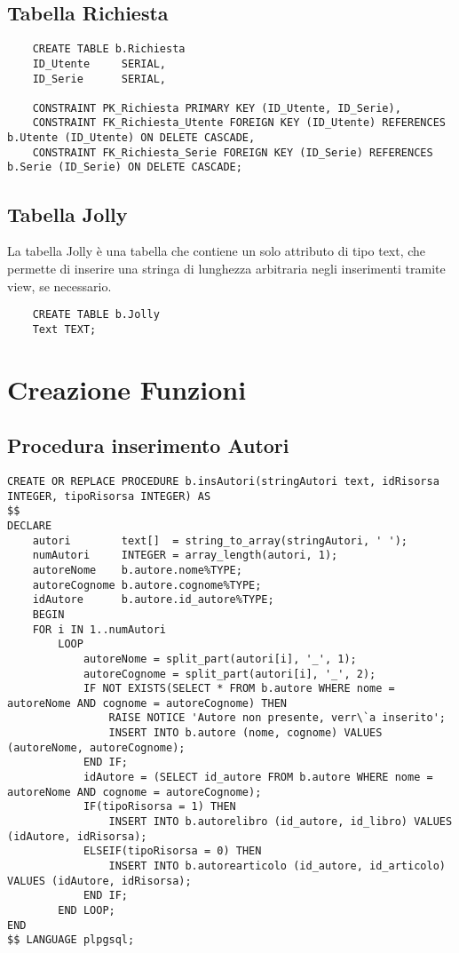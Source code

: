 \newpage

\subsection{Tabella Richiesta}
\begin{lstlisting}
    CREATE TABLE b.Richiesta
    ID_Utente     SERIAL,
    ID_Serie      SERIAL,

    CONSTRAINT PK_Richiesta PRIMARY KEY (ID_Utente, ID_Serie),
    CONSTRAINT FK_Richiesta_Utente FOREIGN KEY (ID_Utente) REFERENCES b.Utente (ID_Utente) ON DELETE CASCADE,
    CONSTRAINT FK_Richiesta_Serie FOREIGN KEY (ID_Serie) REFERENCES b.Serie (ID_Serie) ON DELETE CASCADE;
\end{lstlisting}

\subsection{Tabella Jolly}
La tabella Jolly \`e una tabella che contiene un solo attributo di tipo text, che permette di
inserire una stringa di lunghezza arbitraria negli inserimenti tramite view, se necessario.
\begin{lstlisting}
    CREATE TABLE b.Jolly
    Text TEXT;
\end{lstlisting}

\section{Creazione Funzioni}

\subsection{Procedura inserimento Autori}
\begin{lstlisting}
CREATE OR REPLACE PROCEDURE b.insAutori(stringAutori text, idRisorsa INTEGER, tipoRisorsa INTEGER) AS
$$
DECLARE
    autori        text[]  = string_to_array(stringAutori, ' ');
    numAutori     INTEGER = array_length(autori, 1);
    autoreNome    b.autore.nome%TYPE;
    autoreCognome b.autore.cognome%TYPE;
    idAutore      b.autore.id_autore%TYPE;
    BEGIN
    FOR i IN 1..numAutori
        LOOP
            autoreNome = split_part(autori[i], '_', 1);
            autoreCognome = split_part(autori[i], '_', 2);
            IF NOT EXISTS(SELECT * FROM b.autore WHERE nome = autoreNome AND cognome = autoreCognome) THEN
                RAISE NOTICE 'Autore non presente, verr\`a inserito';
                INSERT INTO b.autore (nome, cognome) VALUES (autoreNome, autoreCognome);
            END IF;
            idAutore = (SELECT id_autore FROM b.autore WHERE nome = autoreNome AND cognome = autoreCognome);
            IF(tipoRisorsa = 1) THEN
                INSERT INTO b.autorelibro (id_autore, id_libro) VALUES (idAutore, idRisorsa);
            ELSEIF(tipoRisorsa = 0) THEN
                INSERT INTO b.autorearticolo (id_autore, id_articolo) VALUES (idAutore, idRisorsa);
            END IF;
        END LOOP;
END
$$ LANGUAGE plpgsql;
\end{lstlisting}


